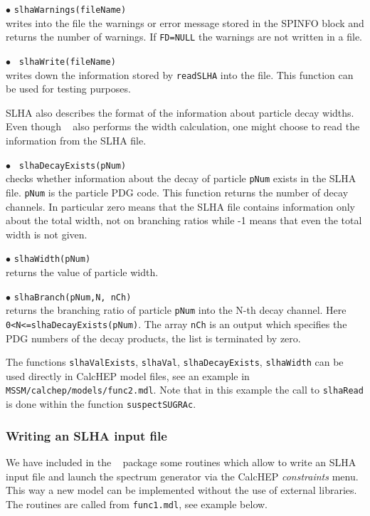 \documentclass[12pt,a4paper]{article}
\begin{document}
{\noindent
$\bullet$ \verb|slhaWarnings(fileName)|\\                                                                              
writes into the file the warnings or error message  stored in the SPINFO block and
returns the number of warnings. If \verb|FD=NULL| the warnings are not written in a file.

\noindent
$\bullet$ \verb| slhaWrite(fileName)|\\
 writes down the information stored by 
\verb|readSLHA| into the file. This function can be used for testing purposes. 

SLHA  also describes the format of the information about particle decay widths.  
Even though \micro~ also performs the width calculation, one might choose to read the information from the SLHA file. 
 


\noindent
$\bullet$ \verb| slhaDecayExists(pNum)|\\
checks whether information about the  decay of particle \verb|pNum| exists in the SLHA file. 
\verb|pNum| is the particle PDG code. This function returns the number 
of decay channels. 
In particular zero means that the SLHA file contains  information only about the total width, not on branching ratios while 
-1 means that even the total width is not given.

\noindent
$\bullet$ \verb|slhaWidth(pNum)|\\ returns the value of particle width.

\noindent
$\bullet$ \verb|slhaBranch(pNum,N, nCh)|\\
returns the  branching ratio of  particle \verb|pNum| into the N-th decay channel. Here\\
\noindent \verb|0<N<=slhaDecayExists(pNum)|.
The array \verb|nCh| is an output which specifies the  PDG numbers of the decay products, the list  
is terminated by zero.

The functions \verb|slhaValExists|, \verb|slhaVal|, 
\verb|slhaDecayExists|, \verb|slhaWidth| can be used directly 
in CalcHEP model files, see an example in \\
\verb|MSSM/calchep/models/func2.mdl|. Note that in this example the 
call to \verb|slhaRead| is done within the function \verb|suspectSUGRAc|.


\subsubsection{Writing an SLHA input file}
We have included in the \micro~ package some routines which allow to write
an SLHA input file and launch the spectrum generator via the CalcHEP 
{\it constraints} menu.  This way a new model can be implemented without the use of
external libraries. The routines are called from \verb|func1.mdl|, see example below.

}
\end{document}
